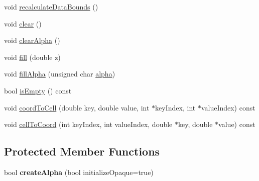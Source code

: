 \begin{DoxyCompactItemize}
\item 
void \hyperlink{classQCPColorMapData_ab235ade8a4d64bd3adb26a99b3dd57ee}{recalculate\+Data\+Bounds} ()
\item 
void \hyperlink{classQCPColorMapData_a9910ba830e96955bd5c8e5bef1e77ef3}{clear} ()
\item 
void \hyperlink{classQCPColorMapData_a14d08b9c3720cd719400079b86d3906b}{clear\+Alpha} ()
\item 
void \hyperlink{classQCPColorMapData_a350f783260eb9b5de5c7b5e0d5d3e3c2}{fill} (double z)
\item 
void \hyperlink{classQCPColorMapData_a93e2a549d7702bc849cd48a585294657}{fill\+Alpha} (unsigned char \hyperlink{classQCPColorMapData_a4f7e6b7a97017400cbbd46f0660e68ea}{alpha})
\item 
bool \hyperlink{classQCPColorMapData_aea88cc75a76ca571acf29b2ba8ac970d}{is\+Empty} () const
\item 
void \hyperlink{classQCPColorMapData_aca5b29e0ca2f299c9060fc6e1f74d0c8}{coord\+To\+Cell} (double key, double value, int $\ast$key\+Index, int $\ast$value\+Index) const
\item 
void \hyperlink{classQCPColorMapData_af1a36385c78ab624cd617065602408b6}{cell\+To\+Coord} (int key\+Index, int value\+Index, double $\ast$key, double $\ast$value) const
\end{DoxyCompactItemize}
\subsection*{Protected Member Functions}
\begin{DoxyCompactItemize}
\item 
\mbox{\label{classQCPColorMapData_a42c2b1c303683515fa4de4c551f54441}} 
bool {\bfseries create\+Alpha} (bool initialize\+Opaque=true)
\end{DoxyCompactItemize}
